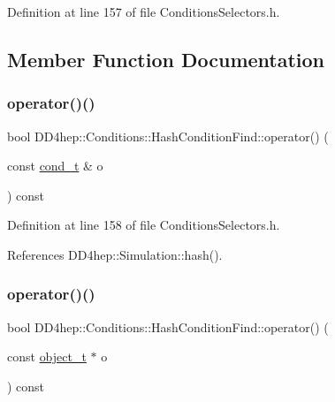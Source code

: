 Definition at line 157 of file Conditions\+Selectors.\+h.



\subsection{Member Function Documentation}
\hypertarget{class_d_d4hep_1_1_conditions_1_1_hash_condition_find_adc62f8efc6338509d172157cdf2f5fe5}{}\label{class_d_d4hep_1_1_conditions_1_1_hash_condition_find_adc62f8efc6338509d172157cdf2f5fe5} 
\subsubsection{\texorpdfstring{operator()()}{operator()()}\hspace{0.1cm}{\footnotesize\ttfamily [1/4]}}
{\footnotesize\ttfamily bool D\+D4hep\+::\+Conditions\+::\+Hash\+Condition\+Find\+::operator() (\begin{DoxyParamCaption}\item[{const \hyperlink{class_d_d4hep_1_1_conditions_1_1_cond_____oper_aceca9f6a0e8c84364946eace47275d09}{cond\+\_\+t} \&}]{o }\end{DoxyParamCaption}) const\hspace{0.3cm}{\ttfamily [inline]}}



Definition at line 158 of file Conditions\+Selectors.\+h.



References D\+D4hep\+::\+Simulation\+::hash().

\hypertarget{class_d_d4hep_1_1_conditions_1_1_hash_condition_find_a6f32ec69f21269d46e522051f1b3b286}{}\label{class_d_d4hep_1_1_conditions_1_1_hash_condition_find_a6f32ec69f21269d46e522051f1b3b286} 
\subsubsection{\texorpdfstring{operator()()}{operator()()}\hspace{0.1cm}{\footnotesize\ttfamily [2/4]}}
{\footnotesize\ttfamily bool D\+D4hep\+::\+Conditions\+::\+Hash\+Condition\+Find\+::operator() (\begin{DoxyParamCaption}\item[{const \hyperlink{class_d_d4hep_1_1_conditions_1_1_cond_____oper_a4229491e49bfd21058dff10125a73f63}{object\+\_\+t} $\ast$}]{o }\end{DoxyParamCaption}) const\hspace{0.3cm}{\ttfamily [inline]}}



